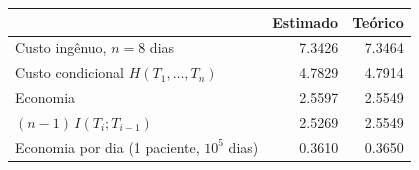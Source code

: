 \begin{tabular}{lrr}
\toprule
 & Estimado & Teórico \\
\midrule
Custo ingênuo, $n=8$ dias & 7.3426 & 7.3464 \\
Custo condicional $H(T_1,\dots,T_n)$ & 4.7829 & 4.7914 \\
Economia & 2.5597 & 2.5549 \\
$(n-1)\,I(T_i;T_{i-1})$ & 2.5269 & 2.5549 \\
Economia por dia (1 paciente, $10^5$ dias) & 0.3610 & 0.3650 \\
\bottomrule
\end{tabular}
